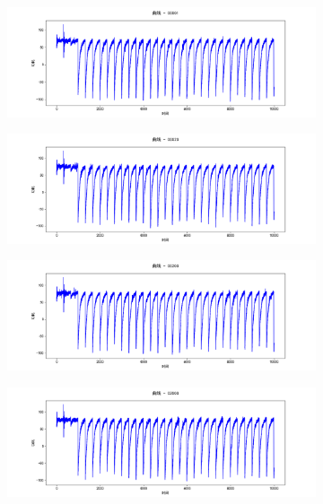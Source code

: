 \begin{figure}[htbp]
    \centering

    \begin{subfigure}{1.0\textwidth}
        \includegraphics[height=.17\textheight, width=1.0\textwidth]{../images/trace_00001.png}
    \end{subfigure}
    \begin{subfigure}{1.0\textwidth}
        \includegraphics[height=.17\textheight, width=1.0\textwidth]{../images/trace_00020.png}
    \end{subfigure}
    \begin{subfigure}{1.0\textwidth}
        \includegraphics[height=.17\textheight, width=1.0\textwidth]{../images/trace_00200.png}
    \end{subfigure}
    \begin{subfigure}{1.0\textwidth}
        \includegraphics[height=.17\textheight, width=1.0\textwidth]{../images/trace_02000.png}

\end{subfigure}
\end{figure}
